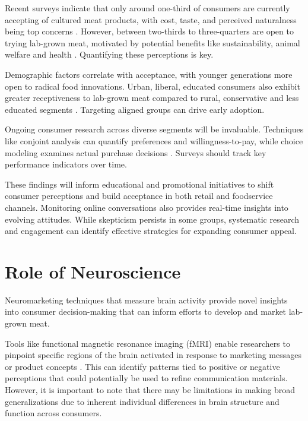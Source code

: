 \documentclass[10pt]{article}
\begin{document}
\begin{sloppypar}
  Recent surveys indicate that only around one-third of consumers are currently accepting of cultured meat products, with cost, taste, and perceived naturalness being top concerns \citep{bryant_consumer_2018}. However, between two-thirds to three-quarters are open to trying lab-grown meat, motivated by potential benefits like sustainability, animal welfare and health \citep{wilks_attitudes_2017}. Quantifying these perceptions is key.

  Demographic factors correlate with acceptance, with younger generations more open to radical food innovations. Urban, liberal, educated consumers also exhibit greater receptiveness to lab-grown meat compared to rural, conservative and less educated segments \citep{circus_exploring_2018}. Targeting aligned groups can drive early adoption.

  Ongoing consumer research across diverse segments will be invaluable. Techniques like conjoint analysis can quantify preferences and willingness-to-pay, while choice modeling examines actual purchase decisions \citep{wilks_attitudes_2017}. Surveys should track key performance indicators over time.

  These findings will inform educational and promotional initiatives to shift consumer perceptions and build acceptance in both retail and foodservice channels. Monitoring online conversations also provides real-time insights into evolving attitudes. While skepticism persists in some groups, systematic research and engagement can identify effective strategies for expanding consumer appeal.

  \section{Role of Neuroscience}
  \label{sec:role-of-neuroscience}

  Neuromarketing techniques that measure brain activity provide novel insights into consumer decision-making that can inform efforts to develop and market lab-grown meat.

  Tools like functional magnetic resonance imaging (fMRI) enable researchers to pinpoint specific regions of the brain activated in response to marketing messages or product concepts \citep{bryant_consumer_2018}. This can identify patterns tied to positive or negative perceptions that could potentially be used to refine communication materials. However, it is important to note that there may be limitations in making broad generalizations due to inherent individual differences in brain structure and function across consumers.


\end{sloppypar}
\end{document}
